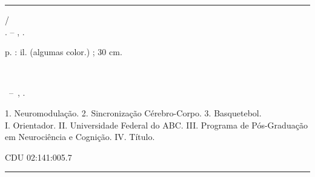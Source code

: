 %
%     
%

\usepackage{lastpage}

\begin{fichacatalografica}
    \vspace*{\fill}
    \hrule
    \begin{center}
    \begin{minipage}[c]{12cm} %

    \imprimirautor

    \hspace{0.5cm} \imprimirtitulo /\\
    \hspace{0.5cm} \imprimirautor. -- \imprimirlocal, \imprimirdata.

    \hspace{0.5cm} \pageref{LastPage} p. : il. (algumas color.) ; 30 cm.

    \hspace{0.5cm} \imprimirorientadorRotulo~\imprimirorientador

    \hspace{0.5cm}
    \parbox[t]{0.9\textwidth}{%
      \imprimirtipotrabalho~--~\imprimirinstituicao,
      \imprimirdata.
    }

    \hspace{0.5cm}
    1. Neuromodulação. 2. Sincronização Cérebro-Corpo. 3. Basquetebol.\\
    I. Orientador. II. Universidade Federal do ABC. III. Programa de Pós-Graduação em Neurociência e Cognição. IV. Título.

    \hspace{8.75cm} CDU 02:141:005.7

    \end{minipage}
    \end{center}
    \hrule
\end{fichacatalografica}
